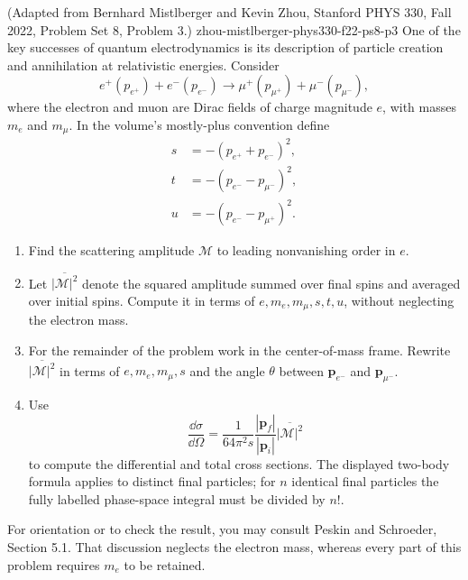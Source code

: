 \begin{enumerate}
  {(Adapted from Bernhard Mistlberger and Kevin Zhou, Stanford PHYS 330, Fall 2022, Problem Set 8, Problem 3.)}
  {zhou-mistlberger-phys330-f22-ps8-p3}
One of the key successes of quantum electrodynamics is its description of
particle creation and annihilation at relativistic energies.  Consider
\[
 e^+(p_{e^+})+e^-(p_{e^-})
 \longrightarrow
 \mu^+(p_{\mu^+})+\mu^-(p_{\mu^-}),
\]
where the electron and muon are Dirac fields of charge magnitude \(e\), with
masses \(m_e\) and \(m_\mu\).  In the volume's mostly-plus convention define
\[
 \begin{split}
 s&=-(p_{e^+}+p_{e^-})^2,\\
 t&=-(p_{e^-}-p_{\mu^-})^2,\\
 u&=-(p_{e^-}-p_{\mu^+})^2.
 \end{split}
\]
\begin{enumerate}
\item
Find the scattering amplitude \(\mathcal M\) to leading nonvanishing order
in \(e\).
\item
Let \(\overline{|\mathcal M|^2}\) denote the squared amplitude summed over
final spins and averaged over initial spins.  Compute it in terms of
\(e,m_e,m_\mu,s,t,u\), without neglecting the electron mass.
\item
For the remainder of the problem work in the center-of-mass frame.  Rewrite
\(\overline{|\mathcal M|^2}\) in terms of
\(e,m_e,m_\mu,s\) and the angle \(\theta\) between
\(\mathbf p_{e^-}\) and \(\mathbf p_{\mu^-}\).
\item
Use
\[
 \frac{\dd\sigma}{\dd\Omega}
 =\frac{1}{64\pi^2s}
 \frac{|\mathbf p_f|}{|\mathbf p_i|}
 \overline{|\mathcal M|^2}
\]
to compute the differential and total cross sections.  The displayed
two-body formula applies to distinct final particles; for \(n\) identical
final particles the fully labelled phase-space integral must be divided by
\(n!\).
\end{enumerate}
For orientation or to check the result, you may consult Peskin and Schroeder,
Section 5.1.  That discussion neglects the electron mass, whereas every part
of this problem requires \(m_e\) to be retained.


\end{enumerate}
